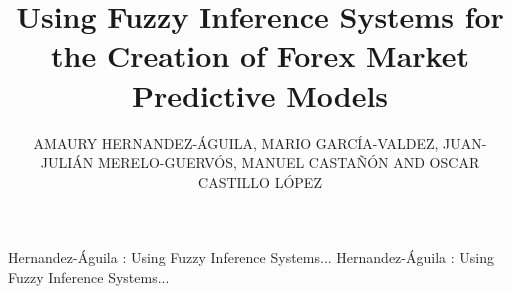 \documentclass{ieeeaccess}
\begin{document}

\title{Using Fuzzy Inference Systems for the Creation of Forex Market Predictive Models}
\author{
    \uppercase{Amaury Hernandez-\'{A}guila,
    Mario Garc\'{i}a-Valdez,
    Juan-Julián Merelo-Guerv\'{o}s,
    Manuel Castañ\'{o}n and
    Oscar Castillo L\'{o}pez}}

\address[1]{National Technological Institute of Mexico, Calzada Del Tecnoló\'{o}ico s/n, Fraccionamiento Tomas Aquino, Tijuana, BC 22414 Mexico (e-mail: {amerhag,mario,ocastillo}@tectijuana.edu.mx)}
\address[2]{University of Granada, Campus Aynadamar Daniel Saucedo Aranda s/n, Granada 18071, 80523 Spain (e-mail: jmerelo@geneura.ugr.es)}
\address[3]{University of Baja California, s/n,  Calzada Universidad No. 14418, Tijuana, México. Building 6E, Suite C-23, Tijuana Campus.(e-mail: puga@uabc.edu.mx)}

\markboth
{Hernandez-\'{A}guila \headeretal: Using Fuzzy Inference Systems... }
{Hernandez-\'{A}guila \headeretal: Using Fuzzy Inference Systems... }

\end{document}

